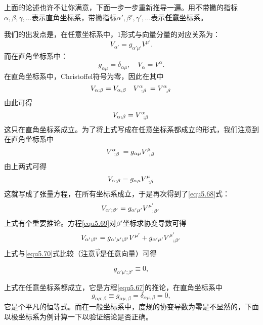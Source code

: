 上面的论述也许不让你满意，下面一步一步重新推导一遍。用不带撇的指标$\alpha, \beta, \gamma, \dots$表示直角坐标系，带撇指标$\alpha', \beta', \gamma', \dots$表示\textbf{任意}坐标系。

我们的出发点是，在任意坐标系中，1形式与向量分量的对应关系为：
\begin{equation}
    V_{\alpha'} = g_{\alpha' \mu'} V^{\mu'}.
\label{equ5.69}
\end{equation}
而在直角坐标系中：
\begin{equation*}
    g_{\alpha \mu} = \delta_{\alpha \mu}, \quad V_{\alpha} = V^\alpha.
\end{equation*}
在直角坐标系中，Christoffel符号为零，因此在其中
\begin{equation*}
    V_{\alpha; \beta} = V_{\alpha, \beta}\quad V\indices{^\alpha_{; \beta}} = V\indices{^\alpha_{, \beta}}
\end{equation*}
由此可得
\[
    V_{\alpha; \beta} = V\indices{^\alpha_{; \beta}}
\]
这只在直角坐标系成立。为了将上式写成在任意坐标系都成立的形式，我们注意到在直角坐标系中
\begin{equation*}
    V\indices{^\alpha_{; \beta}} = g_{\alpha \mu} V\indices{^\mu_{; \beta}}
\end{equation*}
由上两式可得
\[
    V_{\alpha; \beta} = g_{\alpha \mu} V\indices{^\mu_{; \beta}}
\]
这就写成了张量方程，在所有坐标系成立，于是再次得到了\eqref{equ5.68}式：
\begin{equation}
    V_{\alpha'; \beta'} = g_{\alpha' \mu'} V\indices{^{\mu'}_{; \beta'}}
\label{equ5.70}
\end{equation}
上式有个重要推论。方程\eqref{equ5.69}对$\beta'$坐标求协变导数可得
\[
    V_{\alpha'; \beta'} = g_{\alpha' \mu'; \beta'} V^{\mu'} + g_{\alpha' \mu'} V\indices{^{\mu'}_{; \beta'}}    
\]
上式与\eqref{equ5.70}式比较（注意$\vec{V}$是任意向量）可得
\begin{shaded}
\begin{equation}
    g_{\alpha' \mu'; \beta'} \equiv 0,
\label{equ5.71}
\end{equation}
\end{shaded}
上式在任意坐标系都成立，它是方程\eqref{equ5.67}的推论，在直角坐标系中
\[
    g_{\alpha \mu; \beta} \equiv g_{\alpha \mu, \beta} = \delta_{\alpha \mu, \beta} = 0,
\]
它是个平凡的恒等式。而在一般坐标系中，度规的协变导数为零是不显然的，下面以极坐标系为例计算一下以验证结论是否正确。

